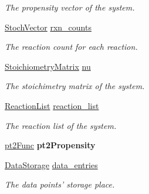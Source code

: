 \begin{CompactItemize}
\begin{CompactList}\small\item\em The propensity vector of the system. \item\end{CompactList}\item 
\hypertarget{class_base_system_acfa32704312ef2828855df6a497477c}{
\hyperlink{class_stoch_vector}{StochVector} \hyperlink{class_base_system_acfa32704312ef2828855df6a497477c}{rxn\_\-counts}}
\label{class_base_system_acfa32704312ef2828855df6a497477c}

\begin{CompactList}\small\item\em The reaction count for each reaction. \item\end{CompactList}\item 
\hypertarget{class_base_system_d664dd55778f4e00a06cb3583b4c27e8}{
\hyperlink{class_stoichiometry_matrix}{StoichiometryMatrix} \hyperlink{class_base_system_d664dd55778f4e00a06cb3583b4c27e8}{nu}}
\label{class_base_system_d664dd55778f4e00a06cb3583b4c27e8}

\begin{CompactList}\small\item\em The stoichimetry matrix of the system. \item\end{CompactList}\item 
\hypertarget{class_base_system_6fed7a53c6fb18e66484889422dfdab6}{
\hyperlink{class_reaction_list}{ReactionList} \hyperlink{class_base_system_6fed7a53c6fb18e66484889422dfdab6}{reaction\_\-list}}
\label{class_base_system_6fed7a53c6fb18e66484889422dfdab6}

\begin{CompactList}\small\item\em The reaction list of the system. \item\end{CompactList}\item 
\hypertarget{class_base_system_42da341904c3e6dbed270c24bf94d0c7}{
\hyperlink{class_base_system_9ce58c7ac60c7208b32233435ee5fd72}{pt2Func} \textbf{pt2Propensity}}
\label{class_base_system_42da341904c3e6dbed270c24bf94d0c7}

\item 
\hyperlink{class_data_storage}{DataStorage} \hyperlink{class_base_system_103c282753d79d2c176feb36ee4fcc2f}{data\_\-entries}
\begin{CompactList}\small\item\em The data points' storage place. \item\end{CompactList}\end{CompactItemize}


